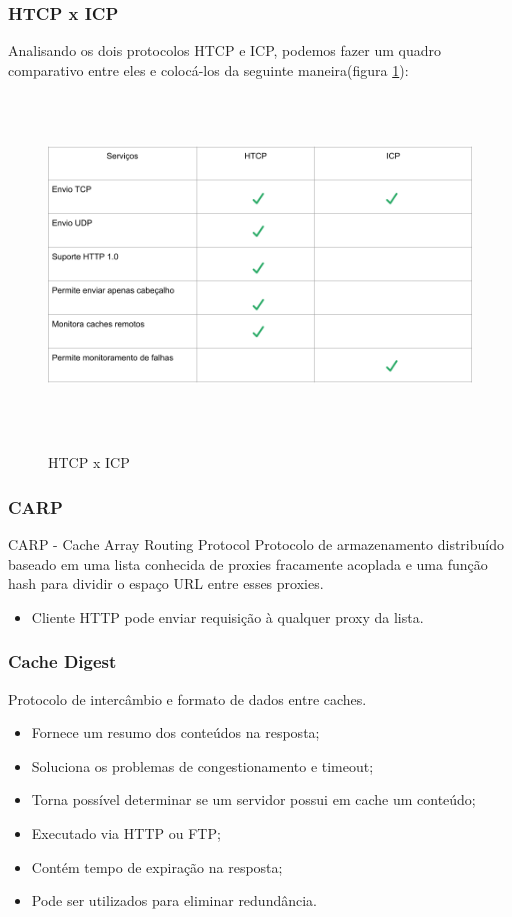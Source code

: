 \subsubsection{HTCP x ICP}
Analisando os dois protocolos HTCP e ICP, podemos fazer um quadro comparativo entre eles e coloc\'a-los da seguinte maneira(figura \ref{figura:htcp_x_icp}):

\begin{figure}[H]
\caption{HTCP x ICP}
\includegraphics[height=9cm]{Figuras/htcp_x_icp.png} 
\label{figura:htcp_x_icp}
\end{figure}

\subsubsection{CARP}
\label{section:CARP}
CARP -  Cache Array Routing Protocol
 Protocolo de armazenamento distribu\'ido baseado em uma lista conhecida de proxies fracamente acoplada e uma fun\c{c}\~ao hash para dividir o espa\c{c}o URL entre esses proxies.
\begin{itemize}
\item Cliente HTTP pode enviar requisi\c{c}\~ao \`a qualquer proxy da lista.
\end{itemize}

\subsubsection{Cache Digest}
\label{section:Cache Digest}
Protocolo de interc\^ambio e formato de dados entre caches.
\begin{itemize}
\item Fornece um resumo dos conte\'udos na resposta;
\item Soluciona os problemas de congestionamento e timeout;
\item Torna poss\'ivel determinar se um servidor possui em cache um conte\'udo;
\item Executado via HTTP ou FTP;
\item Cont\'em tempo de expira\c{c}\~ao na resposta;
\item Pode ser utilizados para eliminar redund\^ancia.
\end{itemize}
